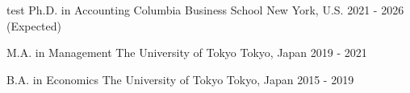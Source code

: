

\begin{cventries}
    test
    \cventry
    {Ph.D. in Accounting} %
    {Columbia Business School} %
    {New York, U.S.} %
    {2021 - 2026 (Expected)} %
    {}

    \cventry
    {M.A. in Management} %
    {The University of Tokyo} %
    {Tokyo, Japan} %
    {2019 - 2021} %
    {}

    \cventry
    {B.A. in Economics} %
    {The University of Tokyo} %
    {Tokyo, Japan} %
    {2015 - 2019} %
    {}

\end{cventries}
